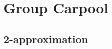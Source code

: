 % 
% 
% 
% 
% 
% 
% 	
% 	
% 	
% 	
% 
\section{Group Carpool}
\label{sec:group}

	
	\subsection{2-approximation}
	
